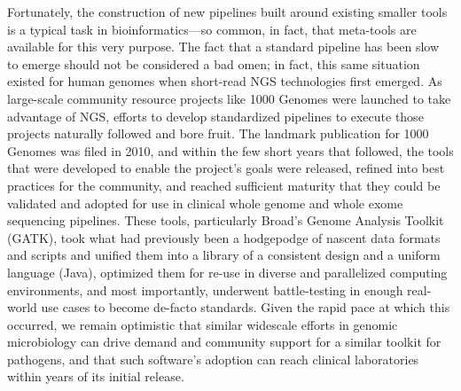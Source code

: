 Fortunately, the construction of new pipelines built around existing smaller tools is a typical task in bioinformatics—so common, in fact, that meta-tools are available for this very purpose.\autocite{Koster2012,Goecks2010,Jamil2013} The fact that a standard pipeline has been slow to emerge should not be considered a bad omen; in fact, this same situation existed for human genomes when short-read NGS technologies first emerged. As large-scale community resource projects like 1000 Genomes were launched to take advantage of NGS, efforts to develop standardized pipelines to execute those projects naturally followed and bore fruit. The landmark publication for 1000 Genomes was filed in 2010,\autocite{Durbin2010} and within the few short years that followed, the tools that were developed to enable the project's goals were released,\autocite{McKenna2010} refined into best practices for the community,\autocite{VanderAuwera2013} and reached sufficient maturity that they could be validated and adopted for use in clinical whole genome and whole exome sequencing pipelines.\autocite{Linderman2014} These tools, particularly Broad's Genome Analysis Toolkit (GATK), took what had previously been a hodgepodge of nascent data formats and scripts and unified them into a library of a consistent design and a uniform language (Java), optimized them for re-use in diverse and parallelized computing environments, and most importantly, underwent battle-testing in enough real-world use cases to become de-facto standards. Given the rapid pace at which this occurred, we remain optimistic that similar widescale efforts in genomic microbiology can drive demand and community support for a similar toolkit for pathogens, and that such software's adoption can reach clinical laboratories within years of its initial release.\autocite{Pak2015}

